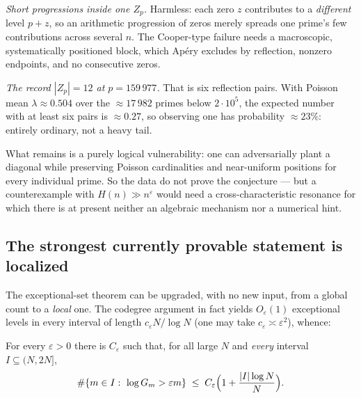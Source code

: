 \emph{Short progressions inside one $Z_p$.}  Harmless: each zero $z$ contributes to a
\emph{different} level $p+z$, so an arithmetic progression of zeros merely spreads one prime's few
contributions across several $n$.  The Cooper-type failure needs a macroscopic, systematically
positioned block, which Apéry excludes by reflection, nonzero endpoints, and no consecutive zeros.

\emph{The record $|Z_p|=12$ at $p=159\,977$.}  That is six reflection pairs.  With Poisson mean
$\lambda\approx0.504$ over the $\approx17\,982$ primes below $2\cdot10^5$, the expected number with
at least six pairs is $\approx0.27$, so observing one has probability $\approx23\%$: entirely
ordinary, not a heavy tail.

What remains is a purely logical vulnerability: one can adversarially plant a diagonal while
preserving Poisson cardinalities and near-uniform positions for every individual prime.  So the
data do not prove the conjecture — but a counterexample with $H(n)\gg n^\varepsilon$ would need a
cross-characteristic resonance for which there is at present neither an algebraic mechanism nor a
numerical hint.

\subsection{The strongest currently provable statement is localized}

The exceptional-set theorem can be upgraded, with no new input, from a global count to a
\emph{local} one.  The codegree argument in fact yields $O_\varepsilon(1)$ exceptional levels in
every interval of length $c_\varepsilon N/\log N$ (one may take $c_\varepsilon\asymp\varepsilon^2$),
whence:

\begin{proposition}
For every $\varepsilon>0$ there is $C_\varepsilon$ such that, for all large $N$ and \emph{every}
interval $I\subseteq(N,2N]$,
\[
  \#\{m\in I:\ \log G_m>\varepsilon m\}\;\le\;C_\varepsilon\Bigl(1+\frac{|I|\log N}N\Bigr).
\]
\end{proposition}

